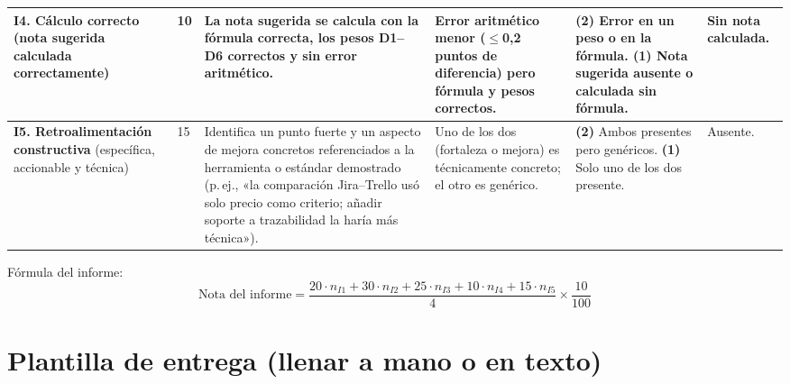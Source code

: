 \documentclass[11pt]{article}
\begin{document}
{\begin{longtable}{|L{2.6cm}|C{0.85cm}|L{3.3cm}|L{3.0cm}|L{3.3cm}|L{2.2cm}|}
	\hline
	 \textbf{I4. Cálculo correcto} (nota sugerida calculada correctamente) & 10 & La nota sugerida se calcula con la fórmula correcta, los pesos D1--D6 correctos y sin error aritmético. & Error aritmético menor ($\leq$0,2 puntos de diferencia) pero fórmula y pesos correctos. & \textbf{(2)} Error en un peso o en la fórmula. \textbf{(1)} Nota sugerida ausente o calculada sin fórmula. & Sin nota calculada.\\
	\hline
	\textbf{I5. Retroalimentación constructiva} (específica, accionable y técnica) & 15 & Identifica un punto fuerte y un aspecto de mejora concretos referenciados a la herramienta o estándar demostrado (p.\,ej., «la comparación Jira--Trello usó solo precio como criterio; añadir soporte a trazabilidad la haría más técnica»). & Uno de los dos (fortaleza o mejora) es técnicamente concreto; el otro es genérico. & \textbf{(2)} Ambos presentes pero genéricos. \textbf{(1)} Solo uno de los dos presente. & Ausente.\\
	\hline
\end{longtable}
}

Fórmula del informe:
\[
	\text{Nota del informe} = \frac{20 \cdot n_{I1} + 30 \cdot n_{I2} + 25 \cdot n_{I3} + 10 \cdot n_{I4} + 15 \cdot n_{I5}}{4} \times \frac{10}{100}
\]

\section{\textcolor{utegreendk}{Plantilla de entrega (llenar a mano o en texto)}}
\end{document}
